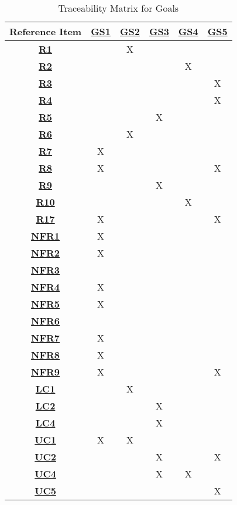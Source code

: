 \begin{table}[ht]
\centering
\begin{tabular}{|c|c|c|c|c|c|}
\hline
\textbf{Reference Item} &
\hyperref[G_enjoyable]{\textbf{GS1}} &
\hyperref[G_multiplayer]{\textbf{GS2}} &
\hyperref[G_customization]{\textbf{GS3}} &
\hyperref[G_presets]{\textbf{GS4}} &
\hyperref[G_3D]{\textbf{GS5}} \\ \hline
\hyperref[R1]{\textbf{R1}} & &X & & & \\ \hline
\hyperref[R2]{\textbf{R2}} & & & &X & \\ \hline
\hyperref[R3]{\textbf{R3}} & & & & &X \\ \hline
\hyperref[R4]{\textbf{R4}} & & & & &X \\ \hline
\hyperref[R5]{\textbf{R5}} & & &X & & \\ \hline
\hyperref[R6]{\textbf{R6}} & &X & & & \\ \hline
\hyperref[R7]{\textbf{R7}} &X & & & & \\ \hline
\hyperref[R8]{\textbf{R8}} &X & & & &X \\ \hline
\hyperref[R9]{\textbf{R9}} & & &X & & \\ \hline
\hyperref[R10]{\textbf{R10}} & & & &X & \\ \hline
\hyperref[R17]{\textbf{R17}} &X & & & &X \\ \hline
\hyperref[NFR1]{\textbf{NFR1}} &X & & & & \\ \hline
\hyperref[NFR2]{\textbf{NFR2}} &X & & & & \\ \hline
\hyperref[NFR3]{\textbf{NFR3}} & & & & & \\ \hline
\hyperref[NFR4]{\textbf{NFR4}} &X & & & & \\ \hline
\hyperref[NFR5]{\textbf{NFR5}} &X & & & & \\ \hline
\hyperref[NFR6]{\textbf{NFR6}} & & & & & \\ \hline
\hyperref[NFR7]{\textbf{NFR7}} &X & & & & \\ \hline
\hyperref[NFR8]{\textbf{NFR8}} &X & & & & \\ \hline
\hyperref[NFR9]{\textbf{NFR9}} &X & & & &X \\ \hline
\hyperref[LC_find_opp]{\textbf{LC1}} & &X & & & \\ \hline
\hyperref[LC_dice]{\textbf{LC2}} & & &X & & \\ \hline
\hyperref[LC_score_calc]{\textbf{LC4}} & & &X & & \\ \hline
\hyperref[ULC_multiplayer]{\textbf{UC1}} &X &X & & & \\ \hline
\hyperref[ULC_dice]{\textbf{UC2}} & & &X & &X \\ \hline
\hyperref[ULC_customization]{\textbf{UC4}} & & &X &X & \\ \hline
\hyperref[ULC_3D]{\textbf{UC5}} & & & & &X \\ \hline
\end{tabular}
\caption{Traceability Matrix for Goals}
\label{table:goals_traceability}
\end{table}


